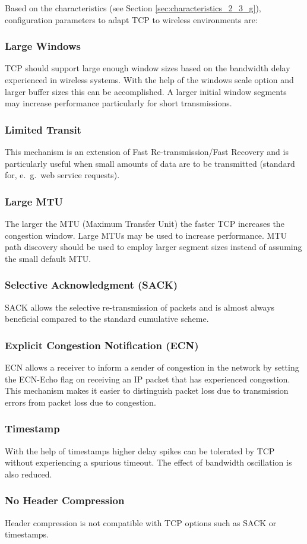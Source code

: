 Based on the characteristics (see Section \ref{sec:characteristics_2_3_g}), configuration parameters to adapt TCP to wireless environments are:

\subsubsection{Large Windows}
TCP should support large enough window sizes based on the bandwidth delay experienced in wireless systems. With the help of the windows scale option and larger buffer sizes this can be accomplished. A larger initial window segments may increase performance particularly for short transmissions.


\subsubsection{Limited Transit}
This mechanism is an extension of Fast Re-transmission/Fast Recovery and is particularly useful when small amounts of data are to be transmitted (standard for, e.\ g.\, web service requests).

\subsubsection{Large MTU}
The larger the MTU (Maximum Transfer Unit) the faster TCP increases the congestion window. Large MTUs may be used to increase performance. MTU path discovery should be used to employ larger segment sizes instead of assuming the small default MTU.


\subsubsection[Selective Acknowledgment]{Selective Acknowledgment (SACK)}
SACK allows the selective re-transmission of packets and is almost always beneficial compared to the standard cumulative scheme.


\subsubsection[Explicit Congestion Notification]{Explicit Congestion Notification (ECN)}
ECN allows a receiver to inform a sender of congestion in the network by setting the ECN-Echo flag on receiving an IP packet that has experienced congestion. This mechanism makes it easier to distinguish packet loss due to transmission errors from packet loss due to congestion.


\subsubsection{Timestamp}
With the help of timestamps higher delay spikes can be tolerated by TCP without experiencing a spurious timeout. The effect of bandwidth oscillation is also reduced.

\subsubsection{No Header Compression}
Header compression is not compatible with TCP options such as SACK or timestamps.

